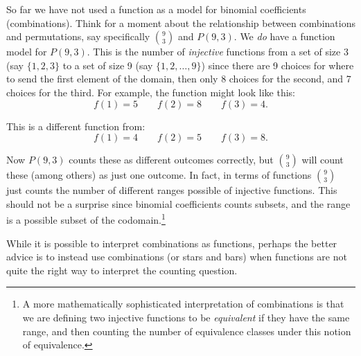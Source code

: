 \documentclass[10pt,]{book}
\theoremstyle{plain}
\theoremstyle{definition}
\theoremstyle{definition}
\theoremstyle{definition}
\numberwithin{equation}{section}
\begin{document}
    So far we have not used a function as a model for binomial coefficients (combinations). Think for a moment about the relationship between combinations and permutations, say specifically \({9 \choose 3}\) and \(P(9,3)\). We \emph{do} have a function model for \(P(9,3)\). This is the number of \emph{injective} functions from a set of size 3 (say \(\{1,2,3\}\) to a set of size 9 (say \(\{1,2,\ldots, 9\}\)) since there are 9 choices for where to send the first element of the domain, then only 8 choices for the second, and 7 choices for the third. For example, the function might look like this:
    \begin{equation*}
      f(1) = 5 \qquad f(2) = 8 \qquad f(3) = 4.
    \end{equation*}
\par

    This is a different function from:
    \begin{equation*}
      f(1) = 4 \qquad f(2) = 5 \qquad f(3) = 8.
    \end{equation*}
\par

    Now \(P(9,3)\) counts these as different outcomes correctly, but \({9\choose 3}\) will count these (among others) as just one outcome. In fact, in terms of functions \({9 \choose 3}\) just counts the number of different ranges possible of injective functions. This should not be a surprise since binomial coefficients counts subsets, and the range is a possible subset of the codomain.\footnote{A more mathematically sophisticated interpretation of combinations is that we are defining two injective functions to be \emph{equivalent} if they have the same range, and then counting the number of equivalence classes under this notion of equivalence.\label{fn-4}}
\par

    While it is possible to interpret combinations as functions, perhaps the better advice is to instead use combinations (or stars and bars) when functions are not quite the right way to interpret the counting question.
\typeout{************************************************}
\typeout{************************************************}
\end{document}

